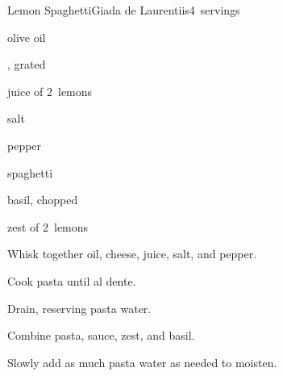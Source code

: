 \begin{recipe}{Lemon Spaghetti}{Giada de Laurentiis}{4~servings}

\begin{ingredients}
\item \C{\twothird} olive oil
\item \C{\twothird} , grated
\item juice of 2~lemons
\item \tp{\threequarter} salt
\item \tp{\half} pepper
\item {} spaghetti
\item \C{\third} basil, chopped
\item zest of 2~lemons
\end{ingredients}

\begin{directions}
\item Whisk together oil, cheese, juice, salt, and pepper.
\item Cook pasta until al dente.
\item Drain, reserving  pasta water.
\item Combine pasta, sauce, zest, and basil.
\item Slowly add as much pasta water as needed to moisten.
\end{directions}

\end{recipe}

